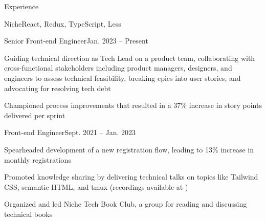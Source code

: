 \documentclass{resume} %
\begin{document}

\begin{rSection}{Experience}
\begin{rCompany}{Niche}{React, Redux, TypeScript, Less}{}{}
\begin{rPromotion}{}{}{Senior Front-end Engineer}{Jan. 2023 – Present}
\item Guiding technical direction as Tech Lead on a product team, collaborating with cross-functional stakeholders including product managers, designers, and engineers to assess technical feasibility, breaking epics into user stories, and advocating for resolving tech debt
\item Championed process improvements that resulted in a 37\% increase in story points delivered per sprint
\end{rPromotion}


\begin{rRole}{}{}{Front-end Engineer}{Sept. 2021 – Jan. 2023}
\item Spearheaded development of a new registration flow, leading to 13\% increase in monthly registrations
\item Promoted knowledge sharing by delivering technical talks on topics like Tailwind CSS, semantic HTML, and tmux (recordings available at \href{http://jgs.lol/}{})
\item Organized and led Niche Tech Book Club, a group for reading and discussing technical books
\end{rRole}
\end{rCompany}


\end{rSection}
\end{document}
